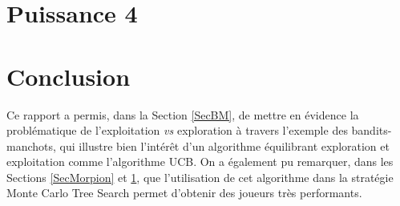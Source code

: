 \documentclass[a4paper,12pt]{article}
\begin{document}
\section{Puissance 4}
\label{SecPuissance4}

\section{Conclusion}

Ce rapport a permis, dans la Section \ref{SecBM}, de mettre en évidence la problématique de l'exploitation \emph{vs} exploration à travers l'exemple des bandits-manchots, qui illustre bien l'intérêt d'un algorithme équilibrant exploration et exploitation comme l'algorithme UCB. On a également pu remarquer, dans les Sections \ref{SecMorpion} et \ref{SecPuissance4}, que l'utilisation de cet algorithme dans la stratégie Monte Carlo Tree Search permet d'obtenir des joueurs très performants.
\end{document}
